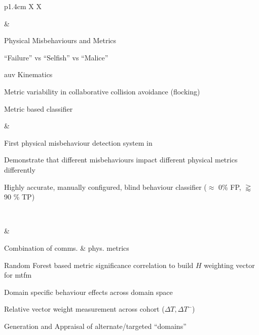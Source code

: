 \begin{table}
{\begin{tabularx}{\textwidth}{p{1.4cm} X X}
			\begin{minipage}[t][][b]{\linewidth}\end{minipage}
			& \begin{minipage}[t]{\linewidth}
				\begin{tightimize} 
					\item Physical Misbehaviours and Metrics
					\item ``Failure'' vs ``Selfish'' vs ``Malice''
					\item \gls{auv} Kinematics
					\item Metric variability in collaborative collision avoidance (flocking)
					\item Metric based classifier
				\end{tightimize}
			\end{minipage}
			& \begin{minipage}[t]{\linewidth}
				\begin{tightimize} 
					\item First physical misbehaviour detection system in \label{uan}
					\item Demonstrate that different misbehaviours impact different physical metrics differently %
					\item Highly accurate, manually configured, blind behaviour classifier ($\approx$ 0\% FP, $\gtrapprox$ 90 \% TP)
				\end{tightimize}
			\end{minipage}\\\midrule
			\begin{minipage}[t][][b]{\linewidth}\end{minipage}
			& \begin{minipage}[t]{\linewidth}
				\begin{tightimize} 
					\item Combination of comms. \& phys. metrics
					\item Random Forest based metric significance correlation to build $H$ weighting vector for \gls{mtfm}
					\item Domain specific behaviour effects across domain space
					\item Relative vector weight measurement across cohort ($\Delta T, \Delta T^-$)
					\item Generation and Appraisal of alternate/targeted ``domains''
				\end{tightimize}
			\end{minipage}

\end{tabularx}}
\end{table}
